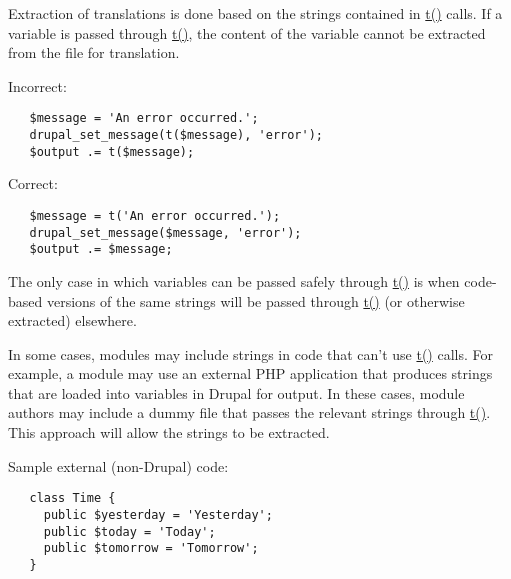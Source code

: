 Extraction of translations is done based on the strings contained in \hyperlink{common_8inc_41d20f0c822bf1f3c26a97981c762665}{t()} calls. If a variable is passed through \hyperlink{common_8inc_41d20f0c822bf1f3c26a97981c762665}{t()}, the content of the variable cannot be extracted from the file for translation.

Incorrect: 

\begin{Code}\begin{verbatim}   $message = 'An error occurred.';
   drupal_set_message(t($message), 'error');
   $output .= t($message);
\end{verbatim}
\end{Code}



Correct: 

\begin{Code}\begin{verbatim}   $message = t('An error occurred.');
   drupal_set_message($message, 'error');
   $output .= $message;
\end{verbatim}
\end{Code}



The only case in which variables can be passed safely through \hyperlink{common_8inc_41d20f0c822bf1f3c26a97981c762665}{t()} is when code-based versions of the same strings will be passed through \hyperlink{common_8inc_41d20f0c822bf1f3c26a97981c762665}{t()} (or otherwise extracted) elsewhere.

In some cases, modules may include strings in code that can't use \hyperlink{common_8inc_41d20f0c822bf1f3c26a97981c762665}{t()} calls. For example, a module may use an external PHP application that produces strings that are loaded into variables in Drupal for output. In these cases, module authors may include a dummy file that passes the relevant strings through \hyperlink{common_8inc_41d20f0c822bf1f3c26a97981c762665}{t()}. This approach will allow the strings to be extracted.

Sample external (non-Drupal) code: 

\begin{Code}\begin{verbatim}   class Time {
     public $yesterday = 'Yesterday';
     public $today = 'Today';
     public $tomorrow = 'Tomorrow';
   }
\end{verbatim}
\end{Code}



